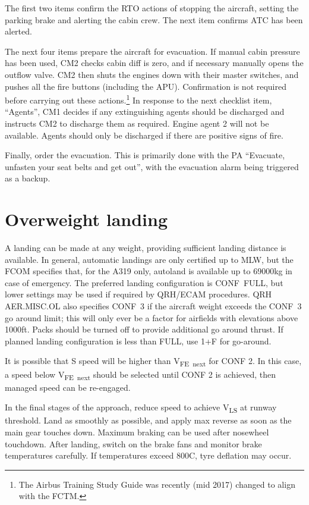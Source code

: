 \documentclass[a5paper,11pt,twoside]{book}
\newcommand{\multicite}[1]{
  \nopagebreak
  \noindent{\footnotesize\color{blue}{[ #1 ]}}
}
\newcommand{\V}[1]{V\textsubscript{#1}}
\begin{document}
The first two items confirm the RTO actions of stopping the aircraft, setting
the parking brake and alerting the cabin crew. The next item confirms ATC has
been alerted.

The next four items prepare the aircraft for evacuation. If manual cabin
pressure has been used, CM2 checks cabin diff is zero, and if necessary manually
opens the outflow valve. CM2 then shuts the engines down with their master
switches, and pushes all the fire buttons (including the APU). Confirmation is
not required before carrying out these actions.\footnote{The Airbus Training
Study Guide was recently (mid 2017) changed to align with the FCTM.}  In
response to the next checklist item, ``Agents'', CM1 decides if any extinguishing
agents should be discharged and instructs CM2 to discharge them as
required. Engine agent 2 will not be available. Agents should only be discharged
if there are positive signs of fire.

Finally, order the evacuation. This is primarily done with the PA ``Evacuate,
unfasten your seat belts and get out'', with the evacuation alarm being triggered
as a backup.

\multicite{EOMB~3.80.1, FCOM~PRO.AER.MISC, FCTM~PRO.AER.MISC}


\section{Overweight landing}

A landing can be made at any weight, providing sufficient landing distance is
available. In general, automatic landings are only certified up to MLW, but the
FCOM specifies that, for the A319 only, autoland is available up to 69000kg in
case of emergency. The preferred landing configuration is CONF~FULL, but lower
settings may be used if required by QRH/ECAM procedures. QRH AER.MISC.OL also
specifies CONF~3 if the aircraft weight exceeds the CONF~3 go around limit; this
will only ever be a factor for airfields with elevations above 1000ft. Packs
should be turned off to provide additional go around thrust. If planned landing
configuration is less than FULL, use 1+F for go-around.

It is possible that S speed will be higher than \V{FE~next} for CONF 2. In this
case, a speed below \V{FE~next} should be selected until CONF 2 is achieved,
then managed speed can be re-engaged.

In the final stages of the approach, reduce speed to achieve \V{LS} at runway
threshold. Land as smoothly as possible, and apply max reverse as soon as the
main gear touches down. Maximum braking can be used after nosewheel
touchdown. After landing, switch on the brake fans and monitor brake
temperatures carefully. If temperatures exceed 800\textdegree C, tyre deflation may occur.
\end{document}
